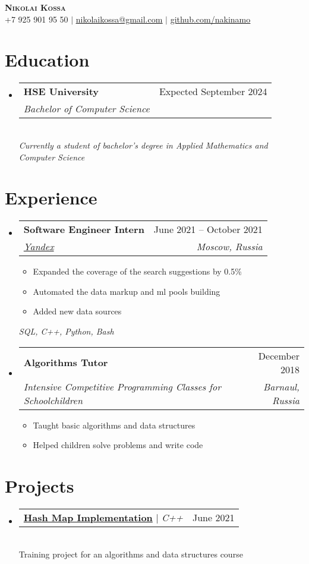 \documentclass[letterpaper,11pt]{article}
\makeatletter
\newcommand{\resumeItem}[1]{
  \item\small{
    {#1 \vspace{-2pt}}
  }
}
\newcommand{\resumeSubheading}[4]{
  \vspace{-2pt}\item
    \begin{tabular*}{0.97\textwidth}[t]{l@{\extracolsep{\fill}}r}
      \textbf{#1} & #2 \\
      \textit{\small#3} & \textit{\small #4} \\
    \end{tabular*}\vspace{-7pt}
}
\newcommand{\resumeProjectHeading}[2]{
    \item
    \begin{tabular*}{0.97\textwidth}{l@{\extracolsep{\fill}}r}
      \small#1 & #2 \\
    \end{tabular*}\vspace{-7pt}
}
\newcommand{\resumeSubHeadingListStart}{\begin{itemize}[leftmargin=0.15in, label={}]}
\newcommand{\resumeSubHeadingListEnd}{\end{itemize}}
\newcommand{\resumeItemListStart}{\begin{itemize}}
\newcommand{\resumeItemListEnd}{\end{itemize}\vspace{-5pt}}
\makeatother
\begin{document}
\begin{center}
    \textbf{\Huge \scshape Nikolai Kossa} \\ \vspace{1pt}
    \small +7 925 901 95 50 $|$ \href{mailto:nikolaikossa@gmail.com}{\underline{nikolaikossa@gmail.com}} $|$ 
    \href{https://github.com/Nakinamo}{\underline{github.com/nakinamo}}
\end{center}


\section{Education}
  \resumeSubHeadingListStart
    \resumeSubheading
      {HSE University}{Expected September 2024}
      {Bachelor of Computer Science}{}
      
      ~\\\emph{\footnotesize Currently a student of bachelor’s degree in Applied Mathematics and Computer Science}
  \resumeSubHeadingListEnd


\section{Experience}
  \resumeSubHeadingListStart

    \resumeSubheading
      {Software Engineer Intern}{June 2021 – October 2021}
      {\href{https://www.yandex.ru}{Yandex}}{Moscow, Russia}
      \resumeItemListStart
        \resumeItem{Expanded the coverage of the search suggestions by 0.5\%}
        \resumeItem{Automated the data markup and ml pools building}
        \resumeItem{Added new data sources}
      \resumeItemListEnd
      \emph{\footnotesize SQL, C++, Python, Bash}
      
    \resumeSubheading
      {Algorithms Tutor}{December 2018}
      {Intensive Competitive Programming Classes for Schoolchildren}{Barnaul, Russia}
      \resumeItemListStart
        \resumeItem{Taught basic algorithms and data structures}
        \resumeItem{Helped children solve problems and write code}
      \resumeItemListEnd
      
     
    \resumeSubHeadingListEnd


\section{Projects}

    \resumeSubHeadingListStart
      \resumeProjectHeading
          {\textbf{\href{https://www.youtube.com/watch?v=dQw4w9WgXcQ}{Hash Map Implementation}} $|$ \emph{C++}}{June 2021}
          ~\\
          \qquad\small{Training project for an algorithms and data structures course}
    \resumeSubHeadingListEnd
\end{document}
